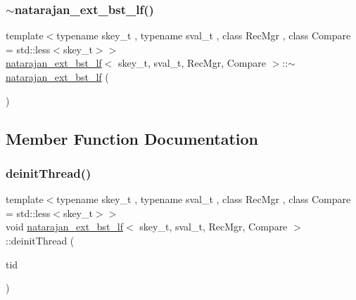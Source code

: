 \mbox{\label{classnatarajan__ext__bst__lf_a3dfa7398463b014b9a1a86d4068dd7a5}} 
\subsubsection{\texorpdfstring{$\sim$natarajan\+\_\+ext\+\_\+bst\+\_\+lf()}{~natarajan\_ext\_bst\_lf()}\hspace{0.1cm}{\footnotesize\ttfamily [2/2]}}
{\footnotesize\ttfamily template$<$typename skey\+\_\+t , typename sval\+\_\+t , class Rec\+Mgr , class Compare  = std\+::less$<$skey\+\_\+t$>$$>$ \\
\hyperlink{classnatarajan__ext__bst__lf}{natarajan\+\_\+ext\+\_\+bst\+\_\+lf}$<$ skey\+\_\+t, sval\+\_\+t, Rec\+Mgr, Compare $>$\+::$\sim$\hyperlink{classnatarajan__ext__bst__lf}{natarajan\+\_\+ext\+\_\+bst\+\_\+lf} (\begin{DoxyParamCaption}{ }\end{DoxyParamCaption})\hspace{0.3cm}{\ttfamily [inline]}}



\subsection{Member Function Documentation}
\mbox{\label{classnatarajan__ext__bst__lf_a51fbc22d01b758dad5a4a64d1d7e62bc}} 
\subsubsection{\texorpdfstring{deinit\+Thread()}{deinitThread()}\hspace{0.1cm}{\footnotesize\ttfamily [1/2]}}
{\footnotesize\ttfamily template$<$typename skey\+\_\+t , typename sval\+\_\+t , class Rec\+Mgr , class Compare  = std\+::less$<$skey\+\_\+t$>$$>$ \\
void \hyperlink{classnatarajan__ext__bst__lf}{natarajan\+\_\+ext\+\_\+bst\+\_\+lf}$<$ skey\+\_\+t, sval\+\_\+t, Rec\+Mgr, Compare $>$\+::deinit\+Thread (\begin{DoxyParamCaption}\item[{const int}]{tid }\end{DoxyParamCaption})\hspace{0.3cm}{\ttfamily [inline]}}

